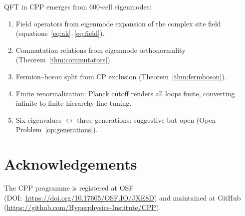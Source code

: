 \documentclass[11pt,letterpaper]{article}
\begin{document}
QFT in CPP emerges from 600-cell eigenmodes:
\begin{enumerate}
\item Field operators from eigenmode expansion of the complex
  site field (equations~\eqref{eq:ak}--\eqref{eq:field}).
\item Commutation relations from eigenmode orthonormality
  (Theorem~\ref{thm:commutators}).
\item Fermion--boson split from CP exclusion
  (Theorem~\ref{thm:fermboson}).
\item Finite renormalization: Planck cutoff renders all loops finite,
  converting infinite to finite hierarchy fine-tuning.
\item Six eigenvalues $\leftrightarrow$ three generations: suggestive
  but open (Open Problem~\ref{op:generations}).
\end{enumerate}


\section*{Acknowledgements}
The CPP programme is registered at OSF (DOI:~\url{https://doi.org/10.17605/OSF.IO/JXE8D}) and maintained at GitHub (\url{https://github.com/Hyperphysics-Institute/CPP}).



\end{document}
